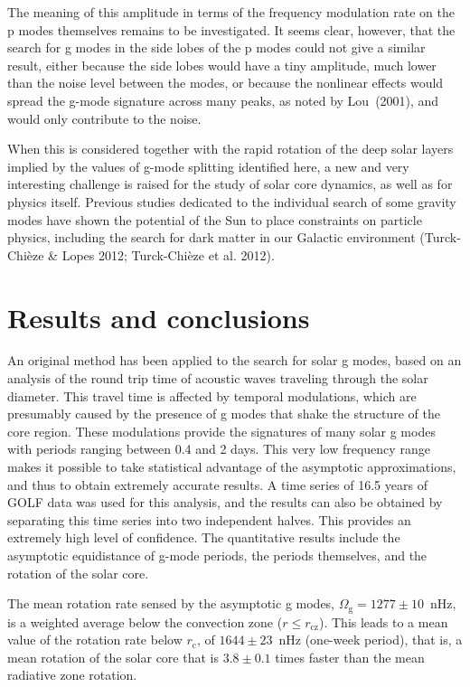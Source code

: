 \documentclass[bibyear]{aa}
\begin{document}
The meaning of this amplitude in terms of the frequency modulation rate on the p modes themselves remains to be investigated. It seems clear, however, that the search for g modes in the side lobes of the p modes could not give a similar result, either because the side lobes would have a tiny amplitude, much lower than the noise level between the modes, or because the nonlinear effects would spread the g-mode signature across many peaks, as noted by Lou~(2001), and would only contribute to the noise. 

When this is considered together with the rapid rotation of the deep solar layers implied by the values of g-mode splitting identified here, a new and very interesting challenge is raised for the study of solar core dynamics, as well as for physics itself. Previous studies dedicated to the individual search of some gravity modes have shown the potential of the Sun to place constraints on particle physics, including the search for dark matter in our Galactic environment (Turck-Chi\`eze \& Lopes 2012; Turck-Chi\`eze et al. 2012). 


\section{Results and conclusions}



An original method has been applied to the search for solar g modes, based on an analysis of the round trip time of acoustic waves traveling through the solar diameter. This travel time is affected by temporal modulations, which are presumably caused by the presence of g modes that shake the structure of the core region. These modulations provide the signatures of many solar g modes with periods ranging between 0.4 and 2 days. This very low frequency range makes it possible to take statistical advantage of the asymptotic approximations, and thus to obtain extremely accurate results. A time series of 16.5 years of GOLF data was used for this analysis, and the results can also be obtained by separating this time series into two independent halves. This provides an extremely high level of confidence. The quantitative results include the asymptotic equidistance of g-mode periods, the periods themselves, and the rotation of the solar core.

 The mean rotation rate sensed by the asymptotic g modes, 
$\Omega_\mathrm{g}=1277\pm 10$~nHz, is a weighted average below the convection zone ($r\le r_\mathrm{cz}$). This leads to a mean value of the rotation rate  below $r_\mathrm{c}$, of 
$1644\pm 23$~nHz  (one-week period),  that is, a mean rotation of the solar core that is $3.8\pm 0.1$ times faster than the mean radiative zone rotation.
\end{document}
